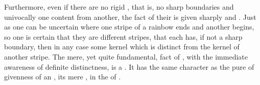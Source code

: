 Furthermore, even if there are no rigid , that is, no sharp
boundaries   and univocally one content from
another, the fact of their  is given sharply and
.  Just as one can be uncertain where one stripe of a rainbow ends
and another begins, so one is certain that they are different stripes, that each
has, if not a sharp boundary, then in any case some kernel which is distinct
from the kernel of another stripe.  The mere, yet quite fundamental, fact of
, with the immediate awareness of definite distinctness, is a
.  It has the same character as the pure  of
givenness of an , its mere , in the  of
.
%
~
